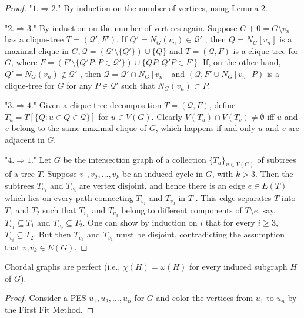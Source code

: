 \begin{proof}
	"$1. \Rightarrow 2.$" By induction on the number of vertices, using Lemma 2.
	
	"$2. \Rightarrow 3.$" By induction on the number of vertices again. Suppose $G+0 = G \setminus v_n$ has a clique-tree	$T = (\mathcal{Q}' , F')$. If $Q' = N_G (v_n) \in \mathcal{Q}'$ , then $Q = N_G [v_n]$ is a maximal clique in $G, \mathcal{Q} = (\mathcal{Q}' \setminus \{Q'\}) \cup \{Q\}$ and $T = (\mathcal{Q}, F)$ is a clique-tree for $G$, where $F = (F' \setminus \{Q' P : P \in \mathcal{Q}'\}) \cup \{QP : Q'P \in F'\}$. If, on the other hand, $Q' = N_G(v_n) \notin \mathcal{Q}'$ , then $\mathcal{Q} = \mathcal{Q}' \cap N_G [v_n]$ and $(\mathcal{Q}, F' \cup N_G [v_n]P)$ is a clique-tree for $G$ for any $P \in \mathcal{Q}'$ such that $N_G (v_n) \subset P$.
	
	"$3. \Rightarrow 4.$" Given a clique-tree decomposition $T = (\mathcal{Q}, F)$, define $T_u = T [\{Q : u \in Q \in \mathcal{Q}\}]$ for
	$u \in V(G)$. Clearly $V(T_u) \cap V(T_v) \neq \emptyset$ iff $u$ and $v$ belong to the same maximal clique of $G$, which happens if and only $u$ and $v$ are adjacent in $G$.
	
	"$4. \Rightarrow 1.$" Let $G$ be the intersection graph of a collection $\{T_u\}_{u \in V(G)}$ of subtrees of a tree $T$. Suppose $v_1, v_2, \dots, v_k$ be an induced cycle in $G$, with $k > 3$. Then the subtrees $T_{v_1}$ and $T_{v_3}$ are vertex disjoint,	and hence there is an edge $e \in E(T)$ which lies on every path connecting $T_{v_1}$ and $T_{v_3}$ in $T$ . This edge separates $T$ into $T_1$ and $T_2$ such that $T_{v_1}$ and $T_{v_3}$ belong to different components of $T \setminus e$, say, $T_{v_1} \subseteq T_1$ and $T_{v_3} \subseteq T_2$. One can show by induction on $i$ that for every $i \geq 3$, $T_{v_i} \subseteq T_2$. But then $T_{v_k}$ and $T_{v_1}$ must be disjoint, contradicting the assumption that $v_1 v_k \in E(G)$.
\end{proof}

\begin{cor}
	Chordal graphs are perfect (i.e., $\chi(H) = \omega(H)$ for every induced subgraph $H$ of $G$).
\end{cor}

\begin{proof}
	Consider a PES $u_1, u_2, \dots, u_n$ for $G$ and color the vertices from $u_1$ to $u_n$ by the First Fit Method.
\end{proof}